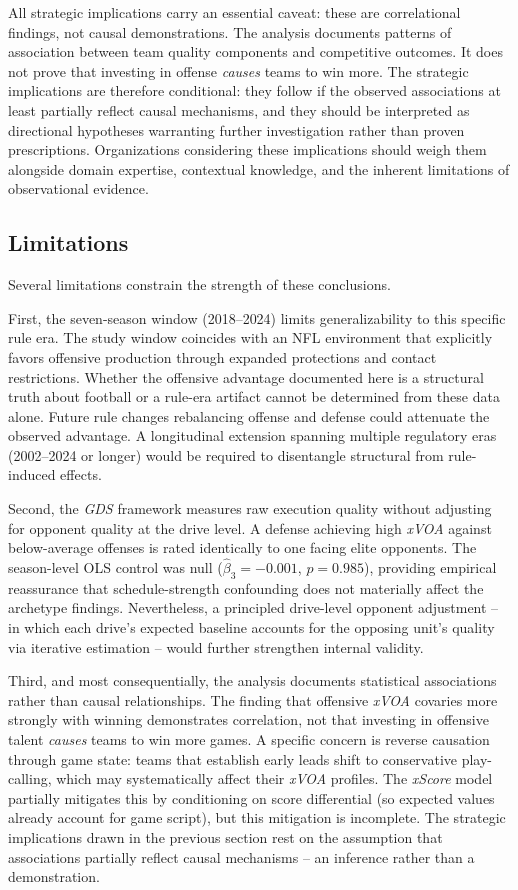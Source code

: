 \documentclass[12pt,a4paper]{article}
\newcommand{\xscore}{\textit{xScore}}
\newcommand{\xvoa}{\textit{xVOA}}
\newcommand{\gds}{\textit{GDS}}
\begin{document}
All strategic implications carry an essential caveat: these are correlational findings, not causal demonstrations. The analysis documents patterns of association between team quality components and competitive outcomes. It does not prove that investing in offense \emph{causes} teams to win more. The strategic implications are therefore conditional: they follow if the observed associations at least partially reflect causal mechanisms, and they should be interpreted as directional hypotheses warranting further investigation rather than proven prescriptions. Organizations considering these implications should weigh them alongside domain expertise, contextual knowledge, and the inherent limitations of observational evidence.

\subsection{Limitations}
\label{sec:limitations}

Several limitations constrain the strength of these conclusions.

First, the seven-season window (2018--2024) limits generalizability to this specific rule era. The study window coincides with an NFL environment that explicitly favors offensive production through expanded protections and contact restrictions. Whether the offensive advantage documented here is a structural truth about football or a rule-era artifact cannot be determined from these data alone. Future rule changes rebalancing offense and defense could attenuate the observed advantage. A longitudinal extension spanning multiple regulatory eras (2002--2024 or longer) would be required to disentangle structural from rule-induced effects.

Second, the \gds{} framework measures raw execution quality without adjusting for opponent quality at the drive level. A defense achieving high \xvoa{} against below-average offenses is rated identically to one facing elite opponents. The season-level OLS control was null ($\hat{\beta}_3 = -0.001$, $p = 0.985$), providing empirical reassurance that schedule-strength confounding does not materially affect the archetype findings. Nevertheless, a principled drive-level opponent adjustment -- in which each drive's expected baseline accounts for the opposing unit's quality via iterative estimation -- would further strengthen internal validity.

Third, and most consequentially, the analysis documents statistical associations rather than causal relationships. The finding that offensive \xvoa{} covaries more strongly with winning demonstrates correlation, not that investing in offensive talent \emph{causes} teams to win more games. A specific concern is reverse causation through game state: teams that establish early leads shift to conservative play-calling, which may systematically affect their \xvoa{} profiles. The \xscore{} model partially mitigates this by conditioning on score differential (so expected values already account for game script), but this mitigation is incomplete. The strategic implications drawn in the previous section rest on the assumption that associations partially reflect causal mechanisms -- an inference rather than a demonstration.
\end{document}
